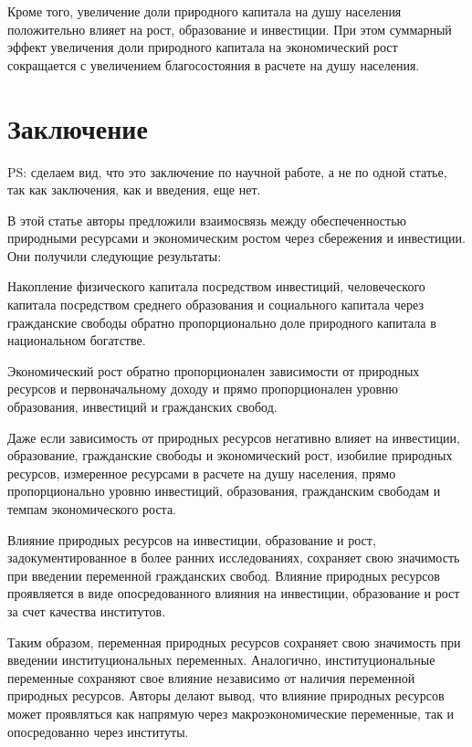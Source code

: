 \documentclass[12pt,a4paper, oneside]{extreport}
\begin{document}
Кроме того, увеличение доли природного капитала на душу населения положительно влияет на рост, образование и инвестиции. При этом суммарный эффект увеличения доли природного капитала на экономический рост сокращается с увеличением благосостояния в расчете на душу населения.

\chapter*{Заключение}

PS: сделаем вид, что это заключение по научной работе, а не по одной статье, так как заключения, как и введения, еще нет.

В этой статье авторы предложили взаимосвязь между обеспеченностью природными ресурсами и экономическим ростом через сбережения и инвестиции. Они получили следующие результаты:
\begin{Enumerate}
	\item Накопление физического капитала посредством инвестиций, человеческого капитала посредством среднего образования и социального капитала через гражданские свободы обратно пропорционально доле природного капитала в национальном богатстве.
	\item Экономический рост обратно пропорционален зависимости от природных ресурсов и первоначальному доходу и прямо пропорционален уровню образования, инвестиций и гражданских свобод.
	\item Даже если зависимость от природных ресурсов негативно влияет на инвестиции, образование, гражданские свободы и экономический рост, изобилие природных ресурсов, измеренное ресурсами в расчете на душу населения, прямо пропорционально уровню инвестиций, образования, гражданским свободам и темпам экономического роста.
	\item Влияние природных ресурсов на инвестиции, образование и рост, задокументированное в более ранних исследованиях, сохраняет свою значимость при введении переменной гражданских свобод. Влияние природных ресурсов проявляется в виде опосредованного влияния на инвестиции, образование и рост за счет качества институтов. 
\end{Enumerate}

Таким образом, переменная природных ресурсов сохраняет свою значимость при введении институциональных переменных. Аналогично, институциональные переменные сохраняют свое влияние независимо от наличия переменной природных ресурсов. Авторы делают вывод, что влияние природных ресурсов может проявляться как напрямую через макроэкономические переменные, так и опосредованно через институты.
\end{document}
